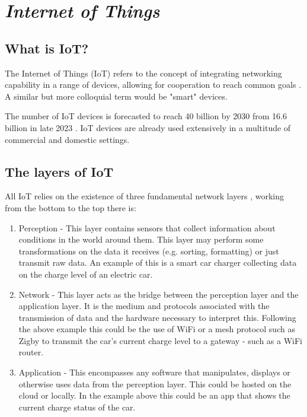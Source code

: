 \section{\emph{Internet of Things}}

\subsection{What is IoT?}

The Internet of Things (IoT) refers to the concept of integrating networking
capability in a range of devices, allowing for cooperation to reach common goals
\cite{atzori2010}. A similar but more colloquial term would be "smart" devices.

The number of IoT devices is forecasted to reach 40 billion by 2030 from 16.6
billion in late 2023 \cite{sinha2024}. IoT devices are already used extensively
in a multitude of commercial and domestic settings.

\subsection{The layers of IoT}

All IoT relies on the existence of three fundamental network layers
\cite{burhan2018iot}, working from the bottom to the top there is:

\begin{enumerate}
  \item Perception - This layer contains sensors that collect information about
  conditions in the world around them. This layer may perform some
  transformations on the data it receives (e.g. sorting, formatting) or just
  transmit raw data. An example of this is a smart car charger collecting data
  on the charge level of an electric car.
  \item Network - This layer acts as the bridge between the perception layer and
  the application layer. It is the medium and protocols associated with the
  transmission of data and the hardware necessary to interpret this. Following
  the above example this could be the use of WiFi or a mesh protocol such as
  Zigby to transmit the car's current charge level to a gateway - such as a WiFi
  router.
  \item Application - This encompasses any software that manipulates, displays
  or otherwise uses data from the perception layer. This could be hosted on the
  cloud or locally. In the example above this could be an app that shows the
  current charge status of the car.
\end{enumerate}


